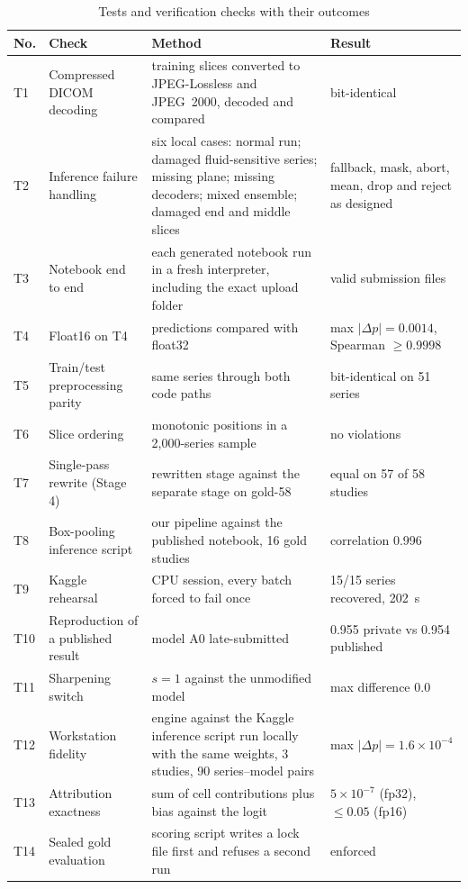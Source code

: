 \begin{table}[htbp]
\centering\footnotesize{}
\caption{Tests and verification checks with their outcomes}
\label{tab:tests}
\begin{tabularx}{\textwidth}{C{0.8cm} L{3.6cm} Y L{2.5cm}}
\toprule
No. & Check & Method & Result \\
\midrule
T1 & Compressed DICOM decoding & training slices converted to JPEG-Lossless and JPEG~2000, decoded and compared & bit-identical \\
T2 & Inference failure handling & six local cases: normal run; damaged fluid-sensitive series; missing plane; missing decoders; mixed ensemble; damaged end and middle slices & fallback, mask, abort, mean, drop and reject as designed \\
T3 & Notebook end to end & each generated notebook run in a fresh interpreter, including the exact upload folder & valid submission files \\
T4 & Float16 on T4 & predictions compared with float32 & max $|\Delta p| = 0.0014$, Spearman $\geq 0.9998$ \\
T5 & Train/test preprocessing parity & same series through both code paths & bit-identical on 51 series \\
T6 & Slice ordering & monotonic positions in a 2,000-series sample & no violations \\
T7 & Single-pass rewrite (Stage 4) & rewritten stage against the separate stage on gold-58 & equal on 57 of 58 studies \\
T8 & Box-pooling inference script & our pipeline against the published notebook, 16 gold studies & correlation 0.996 \\
T9 & Kaggle rehearsal & CPU session, every batch forced to fail once & 15/15 series recovered, 202~s \\
T10 & Reproduction of a published result & model A0 late-submitted & 0.955 private vs 0.954 published \\
T11 & Sharpening switch & $s=1$ against the unmodified model & max difference 0.0 \\
T12 & Workstation fidelity & engine against the Kaggle inference script run locally with the same weights, 3 studies, 90 series--model pairs & max $|\Delta p| = 1.6\times10^{-4}$ \\
T13 & Attribution exactness & sum of cell contributions plus bias against the logit & $5\times10^{-7}$ (fp32), $\leq 0.05$ (fp16) \\
T14 & Sealed gold evaluation & scoring script writes a lock file first and refuses a second run & enforced \\
\bottomrule
\end{tabularx}
\end{table}

